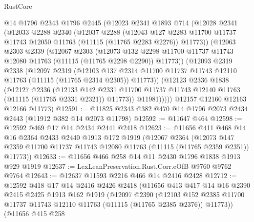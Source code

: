 \begin{lexlean}{RustCore}
\begin{coremodule}
    @14
    @1796
    @2343
    @1796
    @2445
    (@12023
      @2341
      @1893
      @714
      (@12028
        @2341
        (@12033
          @2288
          @2340
          (@12037
            @2288
            (@12043
              @127
              @2283
              @11700
              @11737
              @11743
              @12050
              @11763
              (@11115 (@11765 @2283 @2276))
              @11773))
          (@12063
            @2303
            @2339
            (@12067
              @2303
              (@12073
                @132
                @2298
                @11700
                @11737
                @11743
                @12080
                @11763
                (@11115 (@11765 @2298 @2290))
                @11773))
            (@12093
              @2319
              @2338
              (@12097
                @2319
                (@12103
                  @137
                  @2314
                  @11700
                  @11737
                  @11743
                  @12110
                  @11763
                  (@11115 (@11765 @2314 @2305))
                  @11773))
              (@12123
                @2336
                @1838
                (@12127
                  @2336
                  (@12133
                    @142
                    @2331
                    @11700
                    @11737
                    @11743
                    @12140
                    @11763
                    (@11115 (@11765 @2331 @2321))
                    @11773))
                @11981)))))
      @12157
      @12160
      @12163
      @12166
      @11773)
@12591 := @11825 @2343 @382 @470 @14 @1796 @2073 @2434 @2443 (@11912 @382 @14 @2073 @11798)
@12592 := @11647 @464
@12598 := @12592 @469 @17 @14 @2434 @2441 @2418
@12623 := @11656
    @411
    @468
    @14
    @16
    @2364
    @2433
    @2440
    @1913
    @172
    @1919
    (@12067
      @2364
      (@12073 @147 @2359 @11700 @11737 @11743 @12080 @11763 (@11115 (@11765 @2359 @2351)) @11773))
@12633 := @11656 @466 @258 @14 @11 @2430 @1796 @1838 @1913 @929 @1919
@12637 := LexLeanPreservation.Rust.Corr.eOfB @9760 @9762 @9764
@12643 := @12637 @11593 @2216 @466 @14 @2416 @2428
@12712 := @12592
    @418
    @17
    @14
    @2416
    @2426
    @2418
    (@11656
      @413
      @417
      @14
      @16
      @2390
      @2415
      @2425
      @1913
      @162
      @1919
      (@12097
        @2390
        (@12103 @152 @2385 @11700 @11737 @11743 @12110 @11763 (@11115 (@11765 @2385 @2376)) @11773))
      (@11656
        @415
        @258

\end{coremodule}
\end{lexlean}
